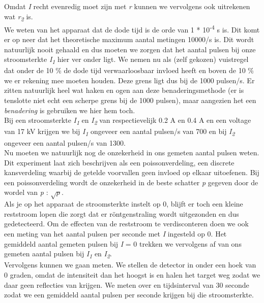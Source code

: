 \documentclass[a4paper]{article}
\begin{document}
Omdat \textit{I} recht evenredig moet zijn met \textit{r} kunnen we vervolgens ook uitrekenen wat \textit{r\textsubscript{2}} is.\\

We weten van het apparaat dat de dode tijd is de orde van 1 * 10\textsuperscript{-4} s is. Dit komt er op neer dat het theoretische maximum aantal metingen 10000/s is. Dit wordt natuurlijk nooit gehaald en dus moeten we zorgen dat het aantal pulsen bij onze stroomsterkte \textit{I\textsubscript{1}} hier ver onder ligt. We nemen nu als (zelf gekozen) vuistregel dat onder de 10 \% de dode tijd verwaarloosbaar invloed heeft en boven de 10 \% we er rekening mee moeten houden. Deze grens ligt dus bij de 1000 pulsen/s. Er zitten natuurlijk heel wat haken en ogen aan deze benaderingsmethode (er is tenslotte niet echt een scherpe grens bij de 1000 pulsen), maar aangezien het een \textit{benadering} is gebruiken we hier hem toch.\\
 
Bij een stroomsterkte \textit{I\textsubscript{1}} en \textit{I\textsubscript{2}} van respectievelijk 0.2 A en 0.4 A en een voltage van 17 kV krijgen we bij \textit{I\textsubscript{1}} ongeveer een aantal pulsen/s van 700 en bij \textit{I\textsubscript{2}} ongeveer een aantal pulsen/s van 1300. \\

Nu moeten we natuurlijk nog de onzekerheid in ons gemeten aantal pulsen weten. Dit experiment laat zich beschrijven als een poissonverdeling, een discrete kansverdeling waarbij de getelde voorvallen geen invloed op elkaar uitoefenen. Bij een poissonverdeling wordt de onzekerheid in de beste schatter \textit{p} gegeven door de wordel van \textit{p} : $\sqrt{\textit{p}}$. \\

Als je op het apparaat de stroomsterkte instelt op 0, blijft er toch een kleine reststroom lopen die zorgt dat er r\"{o}ntgenstraling wordt uitgezonden en dus gedetecteerd. Om de effecten van de reststroom te verdisconteren doen we ook een meting van het aantal pulsen per seconde met \textit{I} ingesteld op 0. Het gemiddeld aantal gemeten pulsen bij \textit{I} = 0 trekken we vervolgens af van ons gemeten aantal pulsen bij \textit{I\textsubscript{1}} en \textit{I\textsubscript{2}}. \\

Vervolgens kunnen we gaan meten. We stellen de detector in onder een hoek van 0 graden, omdat de intensiteit dan het hoogst is en halen het target weg zodat we daar geen reflecties van krijgen. We meten over en tijdsinterval van 30 seconde zodat we een gemiddeld aantal pulsen per seconde krijgen bij die stroomsterkte.\\
\end{document}
